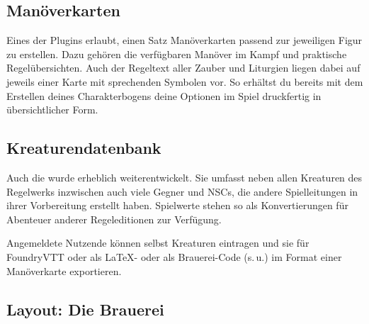 


\subsection*{Manöverkarten}
Eines der Plugins erlaubt, einen Satz Manöverkarten passend zur jeweiligen Figur zu erstellen.
Dazu gehören die verfügbaren Manöver im Kampf und praktische Regelübersichten.
Auch der Regeltext aller Zauber und Liturgien liegen dabei auf jeweils einer Karte mit sprechenden Symbolen vor.
So erhältst du bereits mit dem Erstellen deines Charakterbogens deine Optionen im Spiel druckfertig in übersichtlicher Form.

\subsection*{Kreaturendatenbank}
Auch die  wurde erheblich weiterentwickelt.
Sie umfasst neben allen Kreaturen des Regelwerks inzwischen auch viele Gegner und NSCs, die andere Spielleitungen in ihrer Vorbereitung erstellt haben.
Spielwerte stehen so als Konvertierungen für Abenteuer anderer Regeleditionen zur Verfügung.

Angemeldete Nutzende können selbst Kreaturen eintragen und sie für FoundryVTT oder als LaTeX- oder als Brauerei-Code (s.\,u.) im Format einer Manöverkarte exportieren.

%
%	
%	
%	

\subsection*{Layout: Die Brauerei}


%	
%
%
\spaltenende
